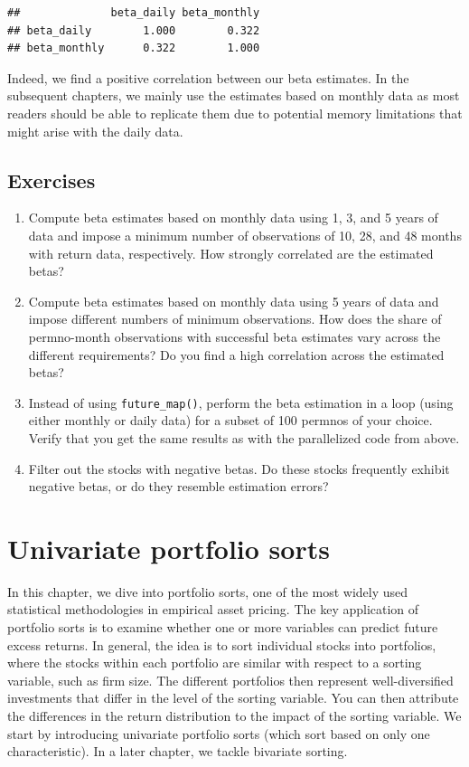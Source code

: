 \documentclass[
]{krantz}
\providecommand{\tightlist}{%
  \setlength{\itemsep}{0pt}\setlength{\parskip}{0pt}}
\begin{document}
\begin{verbatim}
##              beta_daily beta_monthly
## beta_daily        1.000        0.322
## beta_monthly      0.322        1.000
\end{verbatim}

Indeed, we find a positive correlation between our beta estimates. In the subsequent chapters, we mainly use the estimates based on monthly data as most readers should be able to replicate them due to potential memory limitations that might arise with the daily data.

\hypertarget{exercises-2}{%
\section{Exercises}\label{exercises-2}}

\begin{enumerate}
\def\labelenumi{\arabic{enumi}.}
\tightlist
\item
  Compute beta estimates based on monthly data using 1, 3, and 5 years of data and impose a minimum number of observations of 10, 28, and 48 months with return data, respectively. How strongly correlated are the estimated betas?
\item
  Compute beta estimates based on monthly data using 5 years of data and impose different numbers of minimum observations. How does the share of permno-month observations with successful beta estimates vary across the different requirements? Do you find a high correlation across the estimated betas?
\item
  Instead of using \texttt{future\_map()}, perform the beta estimation in a loop (using either monthly or daily data) for a subset of 100 permnos of your choice. Verify that you get the same results as with the parallelized code from above.
\item
  Filter out the stocks with negative betas. Do these stocks frequently exhibit negative betas, or do they resemble estimation errors?
\end{enumerate}

\hypertarget{univariate-portfolio-sorts}{%
\chapter{Univariate portfolio sorts}\label{univariate-portfolio-sorts}}

In this chapter, we dive into portfolio sorts, one of the most widely used statistical methodologies in empirical asset pricing. The key application of portfolio sorts is to examine whether one or more variables can predict future excess returns. In general, the idea is to sort individual stocks into portfolios, where the stocks within each portfolio are similar with respect to a sorting variable, such as firm size. The different portfolios then represent well-diversified investments that differ in the level of the sorting variable. You can then attribute the differences in the return distribution to the impact of the sorting variable.
We start by introducing univariate portfolio sorts (which sort based on only one characteristic). In a later chapter, we tackle bivariate sorting.
\end{document}
